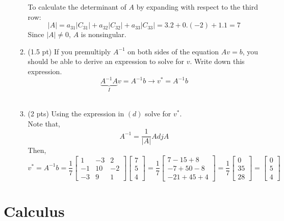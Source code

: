 \documentclass{./../../Latex/tests}
\begin{document}
\begin{enumerate}
\begin{enumerate}
To calculate the determinant of $A$ by expanding with respect to the third row:
$$ |A| = a_{31}|C_{31}| + a_{32}|C_{32}| + a_{33}|C_{33}| = 3.2+0.(-2)+1.1 = 7 $$
Since $|A| \neq 0$, $A$ is nonsingular. \\
  \item (1.5 pt) If you premultiply $A^{-1}$ on both sides of the equation $ Av=b $, you should be able to derive an expression to solve for $v$. Write down this expression. 
  $$ \underbrace{A^{-1}A}_{I}v=A^{-1}b \rightarrow v^* =A^{-1}b  $$\\
  
  \item (2 pts) Using the expression in $(d)$ solve for $v^*$. \\
  
  Note that, $$ A^{-1} = \frac{1}{|A|} Adj A$$
  Then, 
  $$ v^* =A^{-1}b = \frac{1}{7}\begin{bmatrix}
	1 & -3 & 2 \\
	-1 & 10 & -2 \\
	-3 & 9 & 1 
\end{bmatrix} \begin{bmatrix}
	7 \\ 5 \\ 4
\end{bmatrix} = \frac{1}{7} \begin{bmatrix}
	7-15+8 \\ -7+50-8 \\ -21+45+4
\end{bmatrix}  =\frac{1}{7} \begin{bmatrix}
	0 \\ 35 \\ 28
\end{bmatrix} = \begin{bmatrix}
	0 \\ 5 \\ 4
\end{bmatrix}$$
\end{enumerate}

\end{enumerate}

\newpage
\section{Calculus}
\end{document}
